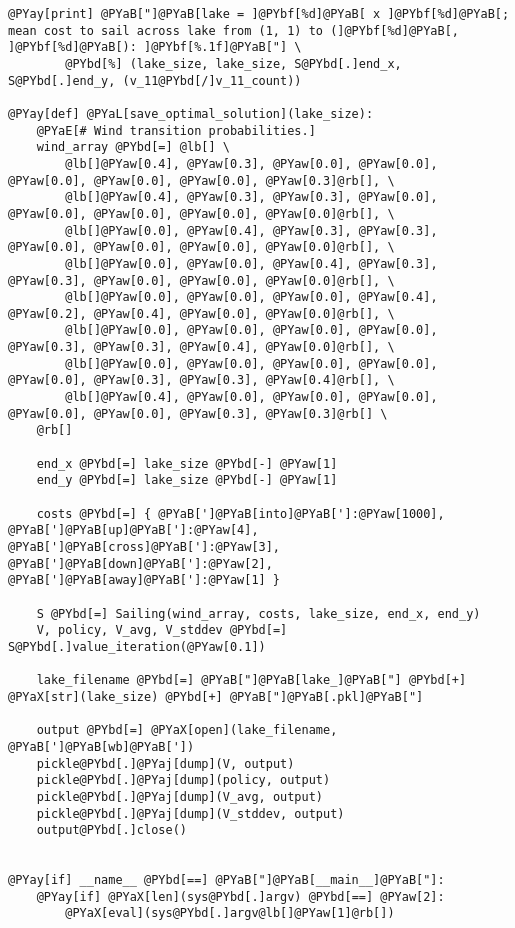 \begin{Verbatim}[commandchars=@\[\]]
    @PYay[print] @PYaB["]@PYaB[lake = ]@PYbf[%d]@PYaB[ x ]@PYbf[%d]@PYaB[; mean cost to sail across lake from (1, 1) to (]@PYbf[%d]@PYaB[, ]@PYbf[%d]@PYaB[): ]@PYbf[%.1f]@PYaB["] \
        @PYbd[%] (lake_size, lake_size, S@PYbd[.]end_x, S@PYbd[.]end_y, (v_11@PYbd[/]v_11_count))

@PYay[def] @PYaL[save_optimal_solution](lake_size):
    @PYaE[# Wind transition probabilities.]
    wind_array @PYbd[=] @lb[] \
        @lb[]@PYaw[0.4], @PYaw[0.3], @PYaw[0.0], @PYaw[0.0], @PYaw[0.0], @PYaw[0.0], @PYaw[0.0], @PYaw[0.3]@rb[], \
        @lb[]@PYaw[0.4], @PYaw[0.3], @PYaw[0.3], @PYaw[0.0], @PYaw[0.0], @PYaw[0.0], @PYaw[0.0], @PYaw[0.0]@rb[], \
        @lb[]@PYaw[0.0], @PYaw[0.4], @PYaw[0.3], @PYaw[0.3], @PYaw[0.0], @PYaw[0.0], @PYaw[0.0], @PYaw[0.0]@rb[], \
        @lb[]@PYaw[0.0], @PYaw[0.0], @PYaw[0.4], @PYaw[0.3], @PYaw[0.3], @PYaw[0.0], @PYaw[0.0], @PYaw[0.0]@rb[], \
        @lb[]@PYaw[0.0], @PYaw[0.0], @PYaw[0.0], @PYaw[0.4], @PYaw[0.2], @PYaw[0.4], @PYaw[0.0], @PYaw[0.0]@rb[], \
        @lb[]@PYaw[0.0], @PYaw[0.0], @PYaw[0.0], @PYaw[0.0], @PYaw[0.3], @PYaw[0.3], @PYaw[0.4], @PYaw[0.0]@rb[], \
        @lb[]@PYaw[0.0], @PYaw[0.0], @PYaw[0.0], @PYaw[0.0], @PYaw[0.0], @PYaw[0.3], @PYaw[0.3], @PYaw[0.4]@rb[], \
        @lb[]@PYaw[0.4], @PYaw[0.0], @PYaw[0.0], @PYaw[0.0], @PYaw[0.0], @PYaw[0.0], @PYaw[0.3], @PYaw[0.3]@rb[] \
    @rb[]

    end_x @PYbd[=] lake_size @PYbd[-] @PYaw[1]
    end_y @PYbd[=] lake_size @PYbd[-] @PYaw[1]

    costs @PYbd[=] { @PYaB[']@PYaB[into]@PYaB[']:@PYaw[1000], @PYaB[']@PYaB[up]@PYaB[']:@PYaw[4], @PYaB[']@PYaB[cross]@PYaB[']:@PYaw[3], @PYaB[']@PYaB[down]@PYaB[']:@PYaw[2], @PYaB[']@PYaB[away]@PYaB[']:@PYaw[1] }

    S @PYbd[=] Sailing(wind_array, costs, lake_size, end_x, end_y)
    V, policy, V_avg, V_stddev @PYbd[=] S@PYbd[.]value_iteration(@PYaw[0.1])

    lake_filename @PYbd[=] @PYaB["]@PYaB[lake_]@PYaB["] @PYbd[+] @PYaX[str](lake_size) @PYbd[+] @PYaB["]@PYaB[.pkl]@PYaB["]

    output @PYbd[=] @PYaX[open](lake_filename, @PYaB[']@PYaB[wb]@PYaB['])
    pickle@PYbd[.]@PYaj[dump](V, output)
    pickle@PYbd[.]@PYaj[dump](policy, output)
    pickle@PYbd[.]@PYaj[dump](V_avg, output)
    pickle@PYbd[.]@PYaj[dump](V_stddev, output)
    output@PYbd[.]close()


@PYay[if] __name__ @PYbd[==] @PYaB["]@PYaB[__main__]@PYaB["]:
    @PYay[if] @PYaX[len](sys@PYbd[.]argv) @PYbd[==] @PYaw[2]:
        @PYaX[eval](sys@PYbd[.]argv@lb[]@PYaw[1]@rb[])
\end{Verbatim}
